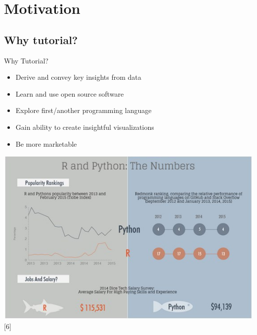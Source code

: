 \section{Motivation}
\subsection{Why tutorial?} 
\normalfont
\begin{frame}
	\begin{center}
  		\begin{alertblock}{Why Tutorial?} 
  			\begin{itemize}
  				\item Derive and convey key insights from data
  				\item Learn and use open source software
  				\item Explore first/another programming language
  				\item Gain ability to create insightful visualizations
  				\item Be more marketable 
  			\end{itemize}
		\end{alertblock}

	       \begin{center}
	         \includegraphics[scale=0.25]{images/r-vs-python-numbers}[6]
	        \end{center}

	\end{center} 
\end{frame}


